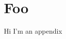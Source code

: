 \documentclass[../HWThesis.tex]{subfiles}
\begin{document}
\chapter{Foo}

Hi I'm an appendix
\end{document}
